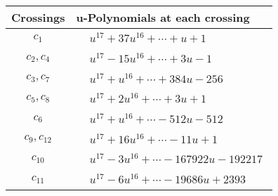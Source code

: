 \documentclass[1p]{elsarticle_modified}
\theoremstyle{definition}
\begin{document}
\begin{tabular}{m{50pt}|m{274pt}}
Crossings & \hspace{64pt}u-Polynomials at each crossing \\
\hline $$\begin{aligned}c_{1}\end{aligned}$$&$\begin{aligned}
&u^{17}+37 u^{16}+\cdots+u+1
\end{aligned}$\\
\hline $$\begin{aligned}c_{2},c_{4}\end{aligned}$$&$\begin{aligned}
&u^{17}-15 u^{16}+\cdots+3 u-1
\end{aligned}$\\
\hline $$\begin{aligned}c_{3},c_{7}\end{aligned}$$&$\begin{aligned}
&u^{17}+u^{16}+\cdots+384 u-256
\end{aligned}$\\
\hline $$\begin{aligned}c_{5},c_{8}\end{aligned}$$&$\begin{aligned}
&u^{17}+2 u^{16}+\cdots+3 u+1
\end{aligned}$\\
\hline $$\begin{aligned}c_{6}\end{aligned}$$&$\begin{aligned}
&u^{17}+u^{16}+\cdots-512 u-512
\end{aligned}$\\
\hline $$\begin{aligned}c_{9},c_{12}\end{aligned}$$&$\begin{aligned}
&u^{17}+16 u^{16}+\cdots-11 u+1
\end{aligned}$\\
\hline $$\begin{aligned}c_{10}\end{aligned}$$&$\begin{aligned}
&u^{17}-3 u^{16}+\cdots-167922 u-192217
\end{aligned}$\\
\hline $$\begin{aligned}c_{11}\end{aligned}$$&$\begin{aligned}
&u^{17}-6 u^{16}+\cdots-19686 u+2393
\end{aligned}$\\
\hline
\end{tabular}\\~\\
\end{document}
